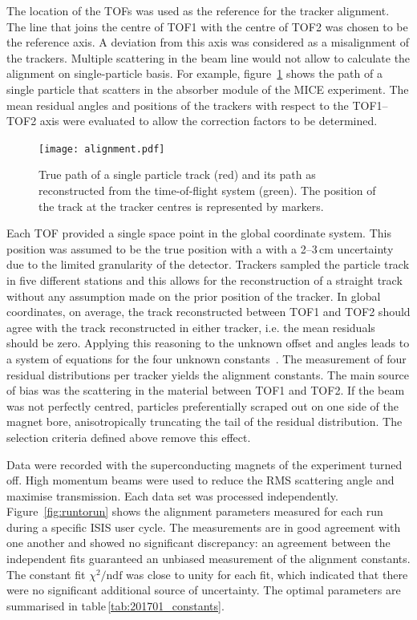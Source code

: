 The location of the TOFs was used as the reference for the tracker alignment. The line that joins the centre of TOF1 with the centre of TOF2 was chosen to be the reference axis. A deviation from this axis was considered as a misalignment of the trackers. Multiple scattering in the beam line would not allow to calculate the alignment on single-particle basis. For example, figure~\ref{fig:align_bl} shows the path of a single particle that scatters in the absorber module of the MICE experiment.
 The mean residual angles and positions of the trackers with respect to the TOF1--TOF2 axis were evaluated to allow the correction factors to be determined.

\begin{figure}
	\begin{center}
		\texttt{[image: alignment.pdf]}
	\end{center}
	\caption{
		True path of a single particle track (red) and its path as reconstructed from the time-of-flight system (green). The position of the track at the tracker centres is represented by markers.
	}
	\label{fig:align_bl}
\end{figure}

Each TOF provided a single space point in the global coordinate system. This position was assumed to be the true position with a with a 2--3\,cm uncertainty due to the limited granularity of the detector.
Trackers sampled the particle track in five different stations and this allows for the reconstruction of a straight track without any assumption made on the prior position of the tracker.
In global coordinates, on average, the track reconstructed between TOF1 and TOF2 should agree with the track reconstructed in either tracker, i.e. the mean residuals should be zero. Applying this reasoning to the unknown offset and angles leads to a system of equations for the four unknown constants~\cite{2018arXiv1805.06623T}.
The measurement of four residual distributions per tracker yields the alignment constants.
The main source of bias was the scattering in the material between TOF1 and TOF2. If the beam was not perfectly centred, particles preferentially scraped out on one side of the magnet bore, anisotropically truncating the tail of the residual distribution. The selection criteria defined above remove this effect.

Data were recorded with the superconducting magnets of the experiment turned off. High momentum beams were used to reduce the RMS scattering angle and maximise transmission.  
Each data set was processed independently. Figure~\ref{fig:runtorun} shows the alignment parameters measured for each run during a specific ISIS user cycle. The measurements are in good agreement with one another and showed no significant discrepancy: an agreement between the independent fits guaranteed an unbiased measurement of the alignment constants. The constant fit $\chi^2/\text{ndf}$ was close to unity for each fit, which indicated that there were no significant additional source of uncertainty. The optimal parameters are summarised in table\,\ref{tab:201701_constants}. 


